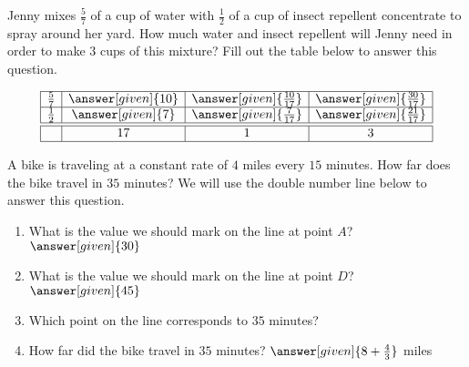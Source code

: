 \documentclass[nooutcomes]{ximera}
\begin{document}
\begin{problem}
Jenny mixes $\frac{5}{7}$ of a cup of water with $\frac{1}{2}$ of a cup of insect repellent concentrate to spray around her yard.  How much water and insect repellent will Jenny need in order to make $3$ cups of this mixture?  Fill out the table below to answer this question.

\[
\begin{array}{|c|c|c|c|} \hline
\frac{5}{7} & \answer[given]{10} & \answer[given]{\frac{10}{17}} & \answer[given]{\frac{30}{17}} \\ \hline
\frac{1}{2} & \answer[given]{7} & \answer[given]{\frac{7}{17}} & \answer[given]{\frac{21}{17}} \\ \hline \hline
  & 17 & 1 & 3 \\ \hline
\end{array}
\]

\end{problem}




\begin{problem}
A bike is traveling at a constant rate of $4$ miles every $15$ minutes.  How far does the bike travel in $35$ minutes?  We will use the double number line below to answer this question.

\begin{center}
\end{center}
\begin{enumerate}
	\item What is the value we should mark on the line at point $A$? $\answer[given]{30}$
	\item What is the value we should mark on the line at point $D$? $\answer[given]{45}$
	\item Which point on the line corresponds to $35$ minutes?
		 \begin{multipleChoice}
		 \end{multipleChoice}
	\item How far did the bike travel in $35$ minutes? $\answer[given]{8+\frac{4}{3}}$ miles
\end{enumerate}

\end{problem}
\end{document}
